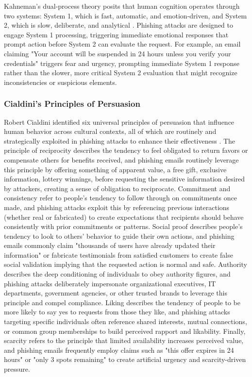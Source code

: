 Kahneman's dual-process theory posits that human cognition operates through two systems: System 1, which is fast, automatic, and emotion-driven, and System 2, which is slow, deliberate, and analytical \cite{kahneman2011thinking}. Phishing attacks are designed to engage System 1 processing, triggering immediate emotional responses that prompt action before System 2 can evaluate the request. For example, an email claiming "Your account will be suspended in 24 hours unless you verify your credentials" triggers fear and urgency, prompting immediate System 1 response rather than the slower, more critical System 2 evaluation that might recognize inconsistencies or suspicious elements.

\subsubsection{Cialdini's Principles of Persuasion}

Robert Cialdini identified six universal principles of persuasion that influence human behavior across cultural contexts, all of which are routinely and strategically exploited in phishing attacks to enhance their effectiveness \cite{cialdini2009influence}. The principle of reciprocity describes the tendency to feel obligated to return favors or compensate others for benefits received, and phishing emails routinely leverage this principle by offering something of apparent value, a free gift, exclusive information, lottery winnings, before requesting the sensitive information desired by attackers, creating a sense of obligation to reciprocate. Commitment and consistency refer to people's tendency to follow through on commitments once made, and phishing attacks exploit this by referencing previous interactions (whether real or fabricated) to create expectations that recipients should behave consistently with prior commitments or patterns. Social proof describes people's tendency to look to others' behavior to guide their own actions, and phishing emails commonly claim "thousands of users have already updated their information" or fabricate testimonials from satisfied customers to create false social validation implying that the requested action is normal and safe. Authority describes the deep conditioning of individuals to obey authority figures, and phishing attacks deliberately impersonate organizational executives, IT departments, government agencies, or other trusted brands to leverage this principle and compel compliance. Liking describes the tendency of people to be more likely to say yes to requests from those they like, and phishing attacks targeting specific individuals often reference shared interests, mutual connections, or common group memberships to build perceived rapport and likability. Finally, scarcity refers to the principle that limited availability increases perceived value, and phishing emails frequently employ claims such as "this offer expires in 24 hours" or "only 3 spots remaining" to create artificial urgency and scarcity-driven pressure.

